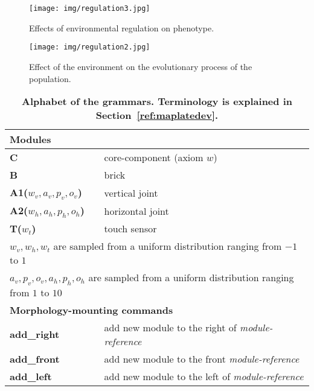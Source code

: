 \documentclass[utf8]{frontiersSCNS} %
\begin{document}
 \begin{figure}[t]
\begin{center}
\texttt{[image: img/regulation3.jpg]}
\caption{Effects of environmental regulation on phenotype.}
\label{fig:regulation3}
\end{center}
\end{figure}


 \begin{figure}[t]
\begin{center}
\texttt{[image: img/regulation2.jpg]}
\caption{Effect of the environment on the evolutionary process of the population.}
\label{fig:regulation2}
\end{center}
\end{figure}


 \begin{table}[t]
\caption{  
{\bf Alphabet of the grammars. Terminology is explained in Section~\ref{ref:maplatedev}.}}
\begin{tabular}{|l|l|}
\hline
\multicolumn{2}{l}{\bf Modules} \\ \hline
 
\textbf{C}  &  core-component  (axiom $w$)\\ \hline
\textbf{B}  &  brick  \\ \hline
\textbf{A1($w_{v}, a_v, p_v, o_v$)}  &  vertical joint  \\ \hline
\textbf{A2($w_{h}, a_h, p_h, o_h$)}  &  horizontal joint  \\ \hline
\textbf{T($w_t$)}  &  touch sensor  \\ \hline
 
\multicolumn{2}{l}{ $w_{v},w_{h}, w_t $   are sampled from a uniform distribution ranging from $-1$ to $1$}\\
\multicolumn{2}{l}{ $ a_v, p_v, o_v, a_h, p_h, o_h $ are sampled from a uniform distribution ranging from $1$ to $10$}\\

  \hline
\multicolumn{2}{l}{\textbf{Morphology-mounting commands}} \\ \hline 
\textbf{add\_right}  & add new module to the right of  \textit{module-reference}\\ \hline
\textbf{add\_front}  & add new module to the front \textit{module-reference}  \\ \hline
\textbf{add\_left}  & add new module to the left of \textit{module-reference}  \\ \hline


\end{tabular}
\end{table}
\end{document}
